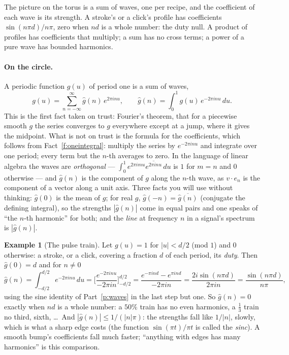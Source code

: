 \documentclass[10pt]{article}
\theoremstyle{plain}
\theoremstyle{definition}
\newtheorem{example}[fact]{Example}
\begin{document}
\begin{why}
The picture on the torus is a sum of waves, one per recipe, and the
coefficient of each wave is its strength. A stroke's or a click's profile
has coefficients $\sin(n\pi d)/n\pi$, zero when $nd$ is a whole number:
the duty null. A product of profiles has coefficients that multiply; a sum
has no cross terms; a power of a pure wave has bounded harmonics.
\end{why}

\paragraph{On the circle.}
A periodic function $g(u)$ of period one is a sum of waves,
\[
  g(u)=\sum_{n=-\infty}^{\infty}\hat g(n)\,e^{2\pi i n u},\qquad
  \hat g(n)=\int_0^1 g(u)\,e^{-2\pi i n u}\,du .
\]
This is the first fact taken on trust: Fourier's theorem, that for a
piecewise smooth $g$ the series converges to $g$ everywhere except at a
jump, where it gives the midpoint. What is not on trust is the formula for
the coefficients, which follows from Fact~\ref{f:oneintegral}: multiply the
series by $e^{-2\pi inu}$ and integrate over one period; every term but the
$n$-th averages to zero. In the language of linear algebra the waves are
\emph{orthogonal} --- $\int_0^1e^{2\pi imu}\overline{e^{2\pi inu}}\,du$ is
$1$ for $m=n$ and $0$ otherwise --- and $\hat g(n)$ is the component of $g$
along the $n$-th wave, as $v\cdot e_n$ is the component of a vector along a
unit axis. Three facts you will use without thinking: $\hat g(0)$ is the
mean of $g$; for real $g$, $\hat g(-n)=\overline{\hat g(n)}$ (conjugate the
defining integral), so the strengths $|\hat g(n)|$ come in equal pairs and
one speaks of ``the $n$-th harmonic'' for both; and the \emph{line} at
frequency $n$ in a signal's spectrum is $|\hat g(n)|$.

\begin{example}[The pulse train]
\label{e:pulse}
Let $g(u)=1$ for $|u|<d/2$ (mod $1$) and $0$ otherwise: a stroke, or a
click, covering a fraction $d$ of each period, its \emph{duty}. Then
$\hat g(0)=d$ and for $n\ne0$
\[
  \hat g(n)=\int_{-d/2}^{d/2}e^{-2\pi inu}\,du
  =\Big[\frac{e^{-2\pi inu}}{-2\pi in}\Big]_{-d/2}^{d/2}
  =\frac{e^{-\pi ind}-e^{\pi ind}}{-2\pi in}=\frac{2i\sin(n\pi d)}{2\pi in}=\frac{\sin(n\pi d)}{n\pi},
\]
using the sine identity of Part~\ref{p:waves} in the last step but one. So
$\hat g(n)=0$ exactly when $nd$ is a whole number: a $50\%$ train has no
even harmonics, a $\tfrac13$ train no third, sixth, \dots\ And
$|\hat g(n)|\le1/(|n|\pi)$: the strengths fall like $1/|n|$, slowly, which
is what a sharp edge costs (the function $\sin(\pi t)/\pi t$ is called the
\emph{sinc}). A smooth bump's coefficients fall much faster; ``anything
with edges has many harmonics'' is this comparison.
\end{example}
\end{document}
